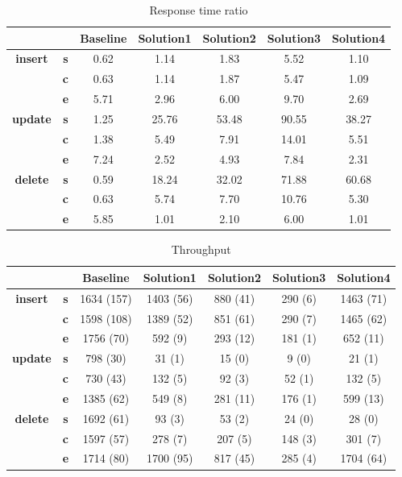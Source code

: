\begin{table}[h]
\newcommand{\B}[1]{\colorbox{light-gray}{#1}}
 \centering
\caption{Response time ratio}\label{t:}
\begin{tabular}{ccccccc}
\toprule
&&\textbf{Baseline} & \textbf{Solution1} & \textbf{Solution2} & \textbf{Solution3} & \textbf{Solution4}\\
\midrule
\multirow{3}{*}{\textbf{insert}} & \textbf{s} & 0.62 & 1.14 & 1.83 & 5.52 & 1.10\\
 & \textbf{c} & 0.63 & 1.14 & 1.87 & 5.47 & 1.09\\
 & \textbf{e} & 5.71 & 2.96 & 6.00 & 9.70 & 2.69\\
\midrule
\multirow{3}{*}{\textbf{update}} & \textbf{s} & 1.25 & 25.76 & 53.48 & 90.55 & 38.27\\
 & \textbf{c} & 1.38 & 5.49 & 7.91 & 14.01 & 5.51\\
 & \textbf{e} & 7.24 & 2.52 & 4.93 & 7.84 & 2.31\\
\midrule
\multirow{3}{*}{\textbf{delete}} & \textbf{s} & 0.59 & 18.24 & 32.02 & 71.88 & 60.68\\
 & \textbf{c} & 0.63 & 5.74 & 7.70 & 10.76 & 5.30\\
 & \textbf{e} & 5.85 & 1.01 & 2.10 & 6.00 & 1.01\\
\bottomrule
\end{tabular}
\end{table}






\begin{table}[h]
\newcommand{\B}[1]{\colorbox{light-gray}{#1}}
 \centering
\caption{Throughput}\label{t:}
\begin{tabular}{ccccccc}
\toprule
&&\textbf{Baseline} & \textbf{Solution1} & \textbf{Solution2} & \textbf{Solution3} & \textbf{Solution4}\\
\midrule
\multirow{3}{*}{\textbf{insert}} & \textbf{s} & 1634 (157) & 1403 (56) & 880 (41) & 290 (6) & 1463 (71)\\
 & \textbf{c} & 1598 (108) & 1389 (52) & 851 (61) & 290 (7) & 1465 (62)\\
 & \textbf{e} & 1756 (70) & 592 (9) & 293 (12) & 181 (1) & 652 (11)\\
\midrule
\multirow{3}{*}{\textbf{update}} & \textbf{s} & 798 (30) & 31 (1) & 15 (0) & 9 (0) & 21 (1)\\
 & \textbf{c} & 730 (43) & 132 (5) & 92 (3) & 52 (1) & 132 (5)\\
 & \textbf{e} & 1385 (62) & 549 (8) & 281 (11) & 176 (1) & 599 (13)\\
\midrule
\multirow{3}{*}{\textbf{delete}} & \textbf{s} & 1692 (61) & 93 (3) & 53 (2) & 24 (0) & 28 (0)\\
 & \textbf{c} & 1597 (57) & 278 (7) & 207 (5) & 148 (3) & 301 (7)\\
 & \textbf{e} & 1714 (80) & 1700 (95) & 817 (45) & 285 (4) & 1704 (64)\\
\bottomrule
\end{tabular}
\end{table}



